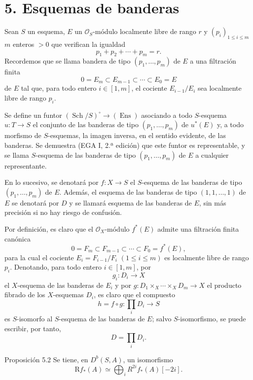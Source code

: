 \section*{5. Esquemas de banderas}

Sean $S$ un esquema, $E$ un $\mathcal O_S$-módulo localmente libre de rango $r$ y $(p_i)_{1\le i\le m}$ $m$ enteros $>0$ que verifican la igualdad
\[
p_1+p_2+\cdots+p_m=r.
\]
Recordemos que se llama bandera de tipo $(p_1,\ldots,p_m)$ de $E$ a una filtración finita
\[
0=E_m\subset E_{m-1}\subset\cdots\subset E_0=E
\]
de $E$ tal que, para todo entero $i\in[1,m]$, el cociente $E_{i-1}/E_i$ sea localmente libre de rango $p_i$.

Se define un funtor $(\operatorname{Sch}/S)^\circ\to(\operatorname{Ens})$ asociando a todo $S$-esquema $u:T\to S$ el conjunto de las banderas de tipo $(p_1,\ldots,p_m)$ de $u^*(E)$ y, a todo morfismo de $S$-esquemas, la imagen inversa, en el sentido evidente, de las banderas. Se demuestra (EGA I, 2.ª edición) que este funtor es representable, y se llama $S$-esquema de las banderas de tipo $(p_1,\ldots,p_m)$ de $E$ a cualquier representante.

En lo sucesivo, se denotará por $f:X\to S$ el $S$-esquema de las banderas de tipo $(p_1,\ldots,p_m)$ de $E$. Además, el esquema de las banderas de tipo $(1,1,\ldots,1)$ de $E$ se denotará por $D$ y se llamará esquema de las banderas de $E$, sin más precisión si no hay riesgo de confusión.

Por definición, es claro que el $\mathcal O_X$-módulo $f^*(E)$ admite una filtración finita canónica
\[
0=F_m\subset F_{m-1}\subset\cdots\subset F_0=f^*(E),
\]
para la cual el cociente $E_i=F_{i-1}/F_i$ $(1\le i\le m)$ es localmente libre de rango $p_i$. Denotando, para todo entero $i\in[1,m]$, por
\[
g_i:D_i\to X
\]
el $X$-esquema de las banderas de $E_i$ y por $g:D_1\times_X\cdots\times_X D_m\to X$ el producto fibrado de los $X$-esquemas $D_i$, es claro que el compuesto
\[
h=f\circ g:\prod_iD_i\to S
\tag{5.1}
\]
es $S$-isomorfo al $S$-esquema de las banderas de $E$; salvo $S$-isomorfismo, se puede escribir, por tanto,
\[
D=\prod_iD_i.
\]

\begin{statement}{Proposición 5.2}
Se tiene, en $D^b(S,A)$, un isomorfismo
\[
\mathrm Rf_*(A)\simeq\bigoplus_i R^{2i}f_*(A)[-2i].
\]
\end{statement}
